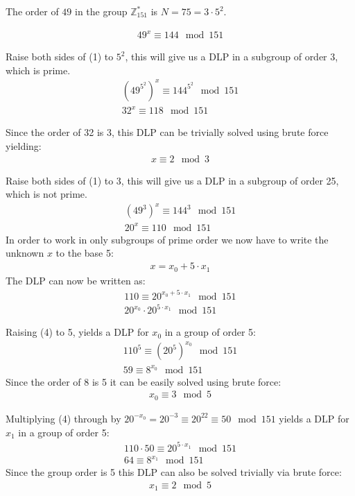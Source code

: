 The order of $49$ in the group $\mathbb{Z}^{*}_{151}$ is $N = 75 = 3 \cdot 5^{2}$.

\begin{eqnarray}
    49^{x} \equiv 144 \mod 151
\end{eqnarray}

Raise both sides of (1) to $5^{2}$, this will give us a DLP in a subgroup of order 3, which is prime.
\begin{eqnarray*}
    (49^{5^{2}})^{x} \equiv 144^{5^{2}} \mod 151 \\
    32^{x} \equiv 118 \mod 151
\end{eqnarray*}

Since the order of 32 is 3, this DLP can be trivially solved using brute force yielding:
\begin{eqnarray}
    x \equiv 2 \mod 3
\end{eqnarray}


Raise both sides of (1) to $3$, this will give us a DLP in a subgroup of order 25, which is not prime.
\begin{eqnarray*}
    (49^{3})^{x} \equiv 144^{3} \mod 151 \\
    20^{x} \equiv 110 \mod 151
\end{eqnarray*}
In order to work in only subgroups of prime order we now have to write the unknown $x$ to the base 5:
\begin{eqnarray*}
    x = x_{0} + 5 \cdot x_{1}
\end{eqnarray*}
The DLP can now be written as:
\begin{eqnarray}
    110 \equiv 20^{x_0 + 5 \cdot x_{1}} \mod 151 \\
    20^{x_0} \cdot 20^{5 \cdot x_{1}} \mod 151
\end{eqnarray}

Raising (4) to 5, yields a DLP for $x_{0}$ in a group of order 5:
\begin{eqnarray*}
    110^{5} \equiv (20^{5})^{x_0} \mod 151 \\ 
    59 \equiv 8^{x_{0}} \mod 151
\end{eqnarray*}
Since the order of 8 is 5 it can be easily solved using brute force:
\begin{eqnarray}
    x_{0} \equiv 3 \mod 5
\end{eqnarray}

Multiplying (4) through by $20^{-x_{0}} = 20^{-3} \equiv 20^{22} \equiv 50 \mod 151$ yields a DLP for $x_{1}$ in a group of order 5:
\begin{eqnarray*}
    110 \cdot 50 \equiv 20^{5 \cdot x_{1}} \mod 151 \\
    64 \equiv 8^{x_{1}} \mod 151
\end{eqnarray*}
Since the group order is 5 this DLP can also be solved trivially via brute force:
\begin{eqnarray}
    x_{1} \equiv 2 \mod 5
\end{eqnarray}

